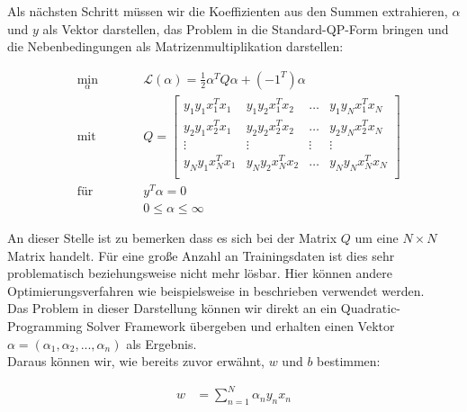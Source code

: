 \documentclass[a4paper,11pt,twoside]{scrreprt}
\newcommand{\Lagr}{\mathcal{L}}
\begin{document}
Als nächsten Schritt müssen wir die Koeffizienten aus den Summen extrahieren, $\alpha$ und $y$ als Vektor darstellen, das Problem in die Standard-QP-Form bringen und die Nebenbedingungen als Matrizenmultiplikation darstellen:


\begin{subequations} \label{qp1}
	\begin{alignat}{2}
		&\!\min_{\alpha}        &\qquad& \Lagr(\alpha) = \frac{1}{2} \alpha^{T} Q \alpha + (-1^T) \alpha \label{eq:qp1}\\
		&\text{mit} &      & Q = \begin{bmatrix} 
			y_{1}y_{1}x_{1}^{T}x_{1} & y_{1}y_{2}x_{1}^{T}x_{2} & \dots & y_{1}y_{N}x_{1}^{T}x_{N}\\
			y_{2}y_{1}x_{2}^{T}x_{1} & y_{2}y_{2}x_{2}^{T}x_{2} & \dots & y_{2}y_{N}x_{2}^{T}x_{N}\\
			\vdots & \vdots & \vdots & \vdots\\
			y_{N}y_{1}x_{N}^{T}x_{1} & y_{N}y_{2}x_{N}^{T}x_{2} & \dots & y_{N}y_{N}x_{N}^{T}x_{N}\\ 
	\end{bmatrix}\\
&\text{für} & & y^{T} \alpha = 0\\
& & & 0 \leq \alpha \leq \infty
	\end{alignat}
\end{subequations}

An dieser Stelle ist zu bemerken dass es sich bei der Matrix $Q$ um eine $N \times N$ Matrix handelt. Für eine große Anzahl an Trainingsdaten ist dies sehr problematisch beziehungsweise nicht mehr lösbar. Hier können andere Optimierungsverfahren wie beispielsweise in \textcite{platt_sequential_1998} beschrieben verwendet werden. \\


Das Problem in dieser Darstellung können wir direkt an ein Quadratic-Programming Solver Framework übergeben und erhalten einen Vektor $\alpha = (\alpha_{1}, \alpha_{2}, ..., \alpha_{n})$ als Ergebnis. \\

Daraus können wir, wie bereits zuvor erwähnt, $w$ und $b$ bestimmen:

\begin{equation} \label{weights_calc_qp}
	\begin{aligned}
		w &= \sum_{n=1}^{N} \alpha_{n} y_{n} x_{n}
	\end{aligned}
\end{equation}
\end{document}
